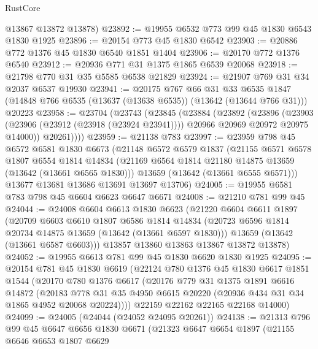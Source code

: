 \begin{lexlean}{RustCore}
\begin{coremodule}
      @13867
      @13872
      @13878)
@23892 := @19955 @6532 @773 @99 @45 @1830 @6543 @1830 @1925
@23896 := @20154 @773 @45 @1830 @6542
@23903 := @20886 @772 @1376 @45 @1830 @6540 @1851 @1404
@23906 := @20170 @772 @1376 @6540
@23912 := @20936 @771 @31 @1375 @1865 @6539 @20068
@23918 := @21798 @770 @31 @35 @5585 @6538 @21829
@23924 := @21907 @769 @31 @34 @2037 @6537 @19930
@23941 := @20175
    @767
    @66
    @31
    @33
    @6535
    @1847
    (@14848 @766 @6535 (@13637 (@13638 @6535)) (@13642 (@13644 @766 @31)))
    @20223
@23958 := @23704
    (@23743
      (@23845
        (@23884
          (@23892
            (@23896
              (@23903
                (@23906 (@23912 (@23918 (@23924 @23941))))
                @20966
                @20969
                @20972
                @20975
                @14000))
            @20261))))
@23959 := @21138 @783
@23997 := @23959
    @798
    @45
    @6572
    @6581
    @1830
    @6673
    (@21148
      @6572
      @6579
      @1837
      (@21155
        @6571
        @6578
        @1807
        @6554
        @1814
        @14834
        (@21169 @6564 @1814 @21180 @14875 @13659 (@13642 (@13661 @6565 @1830)))
        @13659
        (@13642 (@13661 @6555 @6571)))
      @13677
      @13681
      @13686
      @13691
      @13697
      @13706)
@24005 := @19955 @6581 @783 @798 @45 @6604 @6623 @6647 @6671
@24008 := @21210 @781 @99 @45
@24044 := @24008
    @6604
    @6613
    @1830
    @6623
    (@21220
      @6604
      @6611
      @1897
      (@20709
        @6603
        @6610
        @1807
        @6586
        @1814
        @14834
        (@20723 @6596 @1814 @20734 @14875 @13659 (@13642 (@13661 @6597 @1830)))
        @13659
        (@13642 (@13661 @6587 @6603)))
      @13857
      @13860
      @13863
      @13867
      @13872
      @13878)
@24052 := @19955 @6613 @781 @99 @45 @1830 @6620 @1830 @1925
@24095 := @20154
    @781
    @45
    @1830
    @6619
    (@22124
      @780
      @1376
      @45
      @1830
      @6617
      @1851
      @1544
      (@20170
        @780
        @1376
        @6617
        (@20176
          @779
          @31
          @1375
          @1891
          @6616
          @14872
          (@20183 @778 @31 @35 @4950 @6615 @20220 (@20936 @434 @31 @34 @1865 @4952 @20068 @20224))))
      @22159
      @22162
      @22165
      @22168
      @14000)
@24099 := @24005 (@24044 (@24052 @24095 @20261))
@24138 := @21313
    @796
    @99
    @45
    @6647
    @6656
    @1830
    @6671
    (@21323
      @6647
      @6654
      @1897
      (@21155
        @6646
        @6653
        @1807
        @6629

\end{coremodule}
\end{lexlean}
